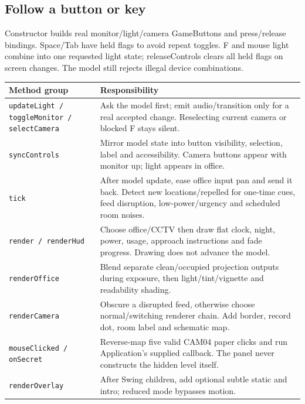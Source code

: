 \documentclass[11pt,a4paper]{article}
\newcommand{\code}[1]{\nolinkurl{#1}}
\begin{document}
\subsection*{Follow a button or key}
Constructor builds real monitor/light/camera GameButtons and press/release bindings. Space/Tab have held flags to avoid repeat toggles. F and mouse light combine into one requested light state; releaseControls clears all held flags on screen changes. The model still rejects illegal device combinations.
\par\noindent\begin{tabularx}{\linewidth}{L{.29\linewidth}X}\toprule\textbf{Method group}&\textbf{Responsibility}\\\midrule
\code{updateLight / toggleMonitor / selectCamera}&Ask the model first; emit audio/transition only for a real accepted change. Reselecting current camera or blocked F stays silent.\\
\code{syncControls}&Mirror model state into button visibility, selection, label and accessibility. Camera buttons appear with monitor up; light appears in office.\\
\code{tick}&After model update, ease office input pan and send it back. Detect new locations/repelled for one-time cues, feed disruption, low-power/urgency and scheduled room noises.\\
\code{render / renderHud}&Choose office/CCTV then draw flat clock, night, power, usage, approach instructions and fade progress. Drawing does not advance the model.\\
\code{renderOffice}&Blend separate clean/occupied projection outputs during exposure, then light/tint/vignette and readability shading.\\
\code{renderCamera}&Obscure a disrupted feed, otherwise choose normal/switching renderer chain. Add border, record dot, room label and schematic map.\\
\code{mouseClicked / onSecret}&Reverse-map five valid CAM04 paper clicks and run Application's supplied callback. The panel never constructs the hidden level itself.\\
\code{renderOverlay}&After Swing children, add optional subtle static and intro; reduced mode bypasses motion.\\\bottomrule\end{tabularx}\par
\end{document}
